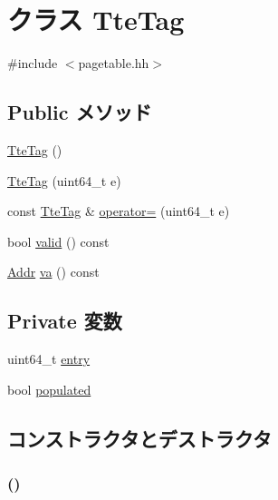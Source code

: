 \hypertarget{classSparcISA_1_1TteTag}{
\section{クラス TteTag}
\label{classSparcISA_1_1TteTag}
}


{\ttfamily \#include $<$pagetable.hh$>$}\subsection*{Public メソッド}
\begin{DoxyCompactItemize}
\item 
\hyperlink{classSparcISA_1_1TteTag_abb07881ccff8f657e4710915a657639e}{TteTag} ()
\item 
\hyperlink{classSparcISA_1_1TteTag_a8f7dc249a9d715effed53335e15101fd}{TteTag} (uint64\_\-t e)
\item 
const \hyperlink{classSparcISA_1_1TteTag}{TteTag} \& \hyperlink{classSparcISA_1_1TteTag_add1276ee8855aa13525810c155a56124}{operator=} (uint64\_\-t e)
\item 
bool \hyperlink{classSparcISA_1_1TteTag_a8d985300b138b6c5556ab17ed4df3b38}{valid} () const 
\item 
\hyperlink{base_2types_8hh_af1bb03d6a4ee096394a6749f0a169232}{Addr} \hyperlink{classSparcISA_1_1TteTag_aeb77f8a1316412aa7d84a8fc26cfc34f}{va} () const 
\end{DoxyCompactItemize}
\subsection*{Private 変数}
\begin{DoxyCompactItemize}
\item 
uint64\_\-t \hyperlink{classSparcISA_1_1TteTag_a6aac0a1a7d70f8270f9bb1222445f370}{entry}
\item 
bool \hyperlink{classSparcISA_1_1TteTag_a09092dab7a486a492b9b5fd4adee5c48}{populated}
\end{DoxyCompactItemize}


\subsection{コンストラクタとデストラクタ}
\hypertarget{classSparcISA_1_1TteTag_abb07881ccff8f657e4710915a657639e}{
\subsubsection[{TteTag}]{ ()}}
\label{classSparcISA_1_1TteTag_abb07881ccff8f657e4710915a657639e}



